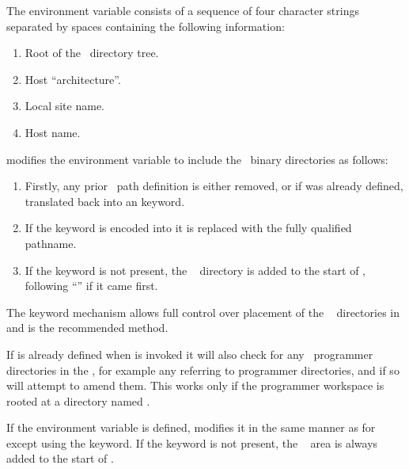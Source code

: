 The  environment variable consists of a sequence of four
character strings separated by spaces containing the following information:

\begin{enumerate}
\item
   Root of the \aipspp\ directory tree.

\item
   Host ``architecture''.

\item
   Local site name.

\item
   Host name.

\end{enumerate}

 modifies the  environment variable to include the
\aipspp\ binary directories as follows:

\begin{enumerate}

\item
   Firstly, any prior \aipspp\ path definition is either removed, or if
    was already defined, translated back into an
    keyword.

\item
   If the keyword  is encoded into  it is replaced
   with the fully qualified pathname.

\item
   If the  keyword is not present, the \aipspp\ 
   directory is added to the start of , following ``'' if
   it came first.

\end{enumerate}

The keyword mechanism allows full control over placement of the \aipspp\ 
 directories in  and is the recommended method.

If  is already defined when  is invoked it will
also check for any \aipspp\ programmer directories in the \code{PATH}, for
example any referring to programmer \file{bin} directories, and if so will
attempt to amend them.  This works only if the programmer workspace is rooted
at a directory named \file{casa}.

If the  environment variable is defined,  modifies
it in the same manner as for \code{PATH} except using the 
keyword.  If the \code{aips\_doc} keyword is not present, the \aipspp\ 
 area is always added to the start of .

